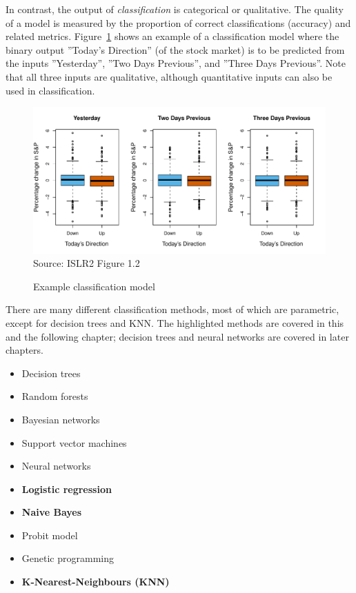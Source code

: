 In contrast, the output of \emph{classification} is categorical or qualitative. The quality of a model is measured by the proportion of correct classifications (accuracy) and related metrics. Figure~\ref{fig:classification} shows an example of a classification model where the binary output ''Today's Direction'' (of the stock market) is to be predicted from the inputs ''Yesterday'', ''Two Days Previous'', and ''Three Days Previous''. Note that all three inputs are qualitative, although quantitative inputs can also be used in classification.

\begin{figure}
\centering
\includegraphics[width=.75\textwidth]{Figures_Chapters_1-6/Chapter1/1_2.pdf} \\
\scriptsize Source: ISLR2 Figure 1.2
\caption{Example classification model}
\label{fig:classification}
\end{figure}

There are many different classification methods, most of which are parametric, except for decision trees and KNN. The highlighted methods are covered in this and the following chapter; decision trees and neural networks are covered in later chapters.

\begin{itemize}
   \item Decision trees
   \item Random forests
   \item Bayesian networks
   \item Support vector machines
   \item Neural networks
   \item \textbf{Logistic regression}
   \item \textbf{Naive Bayes}
   \item Probit model
   \item Genetic programming
   \item \textbf{K-Nearest-Neighbours (KNN)}
\end{itemize}

